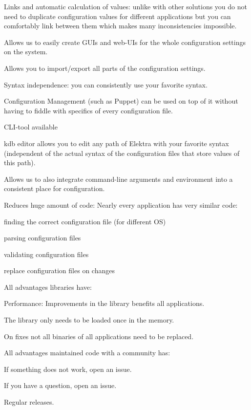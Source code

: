 \begin{DoxyItemize}
\item Links and automatic calculation of values\+: unlike with other solutions you do not need to duplicate configuration values for different applications but you can comfortably link between them which makes many inconsistencies impossible.
\item Allows us to easily create G\+U\+Is and web-\/\+U\+Is for the whole configuration settings on the system.
\item Allows you to import/export all parts of the configuration settings.
\item Syntax independence\+: you can consistently use your favorite syntax.
\item Configuration Management (such as Puppet) can be used on top of it without having to fiddle with specifics of every configuration file.
\item C\+L\+I-\/tool available
\item {\ttfamily kdb editor} allows you to edit any path of Elektra with your favorite syntax (independent of the actual syntax of the configuration files that store values of this path).
\item Allows us to also integrate command-\/line arguments and environment into a consistent place for configuration.
\item Reduces huge amount of code\+: Nearly every application has very similar code\+:
\begin{DoxyItemize}
\item finding the correct configuration file (for different OS)
\item parsing configuration files
\item validating configuration files
\item replace configuration files on changes
\end{DoxyItemize}
\item All advantages libraries have\+:
\begin{DoxyItemize}
\item Performance\+: Improvements in the library benefits all applications.
\item The library only needs to be loaded once in the memory.
\item On fixes not all binaries of all applications need to be replaced.
\end{DoxyItemize}
\item All advantages maintained code with a community has\+:
\begin{DoxyItemize}
\item If something does not work, open an issue.
\item If you have a question, open an issue.
\item Regular releases.
\end{DoxyItemize}
\end{DoxyItemize}


